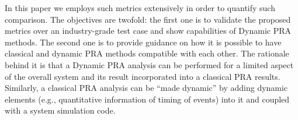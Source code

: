 In this paper we employs such metrics extensively in order to quantify such comparison. 
The objectives are twofold: the first one is to validate the proposed metrics over 
an industry-grade test case and show capabilities of Dynamic PRA methods. 
The second one is to provide guidance on how it is possible to have classical and dynamic
PRA methods compatible with each other. The rationale behind it is that a Dynamic PRA
analysis can be performed for a limited aspect of the overall system and its result 
incorporated into a classical PRA results. Similarly, a classical PRA analysis can be 
``made dynamic'' by adding dynamic elements (e.g., quantitative information of timing 
of events) into it and coupled with a system simulation code.